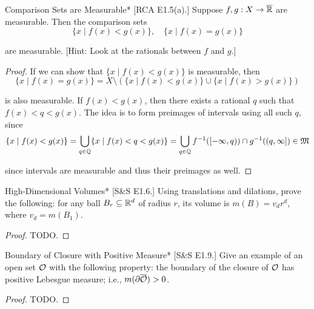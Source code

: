 \begin{problem}{Comparison Sets are Measurable}*
    [RCA E1.5(a).] Suppose \(f,g : X \to \overline{\mathbb{R}}\) are measurable. Then the comparison sets 
    \[
        \{x \mid f(x) < g(x)\}, \quad \{x \mid f(x) = g(x)\}
    \]

    are measurable. [Hint: Look at the rationals between \(f\) and \(g\).]
\end{problem}

\begin{proof}
    If we can show that \(\{x \mid f(x) < g(x)\}\) is measurable, then 
    \[
        \{x \mid f(x) = g(x)\} = X \setminus (\{x \mid f(x) < g(x)\} \cup \{x \mid f(x) > g(x)\})
    \] 

    is also measurable. If \(f(x) < g(x)\), then there exists a rational \(q\) such that \(f(x) < q < g(x)\). The idea is to form preimages of intervals using all such \(q\), since 
    \[
    \{x \mid f(x) < g(x) \}
    = \bigcup_{q \in \mathbb{Q}} \{x \mid f(x) < q < g(x)\}
    = \bigcup_{q \in \mathbb{Q}} f^{-1}([-\infty, q)) \cap g^{-1}((q, \infty])
    \in \mathfrak{M}
    \]

    since intervals are measurable and thus their preimages as well. 
\end{proof}

\begin{problem}{High-Dimensional Volumes}*
    [S\&S E1.6.] Using translations and dilations, prove the following: for any ball \(B_r \subseteq \mathbb{R}^d\) of radius \(r\), its volume is \(m(B) = v_d r^d\), where \(v_d = m(B_1)\). 
\end{problem}

\begin{proof}
    TODO. 
\end{proof}

\begin{problem}{Boundary of Closure with Positive Measure}*
    [S\&S E1.9.] Give an example of an open set \(\mathcal{O}\) with the following property: the boundary of the closure of \(\mathcal{O}\) has positive Lebesgue measure; i.e., \(m(\partial \overline{\mathcal{O}}) > 0\). 
\end{problem}

\begin{proof}
    TODO. 
\end{proof}

